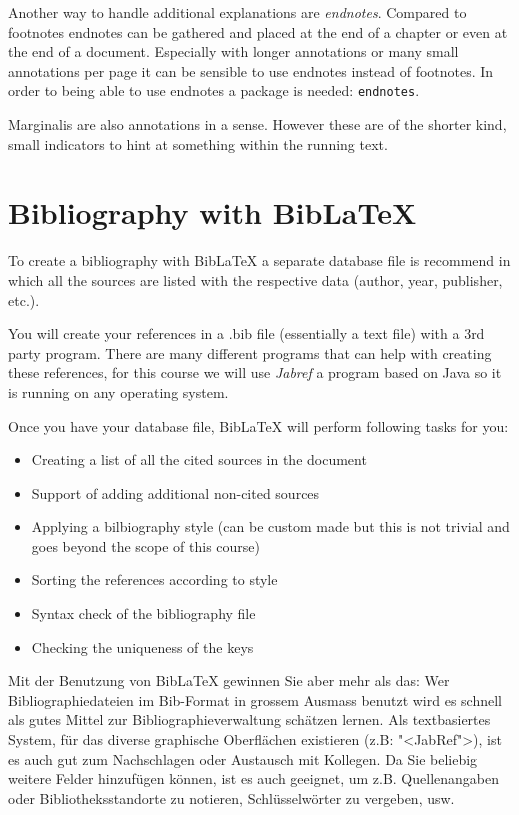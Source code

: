 \documentclass[11pt, a4paper]{article}
\newcommand{\ltx}{\LaTeX}
\let\oldmarginpar\marginpar
\renewcommand{\marginpar}[1]{\oldmarginpar{\textit{#1}}}
\begin{document}
Another way to handle additional explanations are \textit{endnotes}\marginpar{endnotes}. Compared to footnotes endnotes can be gathered and placed at the end of a chapter or even at the end of a document. Especially with longer annotations or many small annotations per page it can be sensible to use endnotes instead of footnotes. In order to being able to use endnotes a package is needed: \texttt{endnotes}.

Marginalis\marginpar{Marginalis} are also annotations in a sense. However these are of the shorter kind, small indicators to hint at something within the running text.

\section{Bibliography with Bib\LaTeX}

To create a bibliography with Bib\ltx{} a separate database file is recommend in which all the sources are listed with the respective data (author, year, publisher, etc.). 

You will create your references in a .bib file (essentially a text file) with a 3rd party program. There are many different programs that can help with creating these references, for this course we will use \textit{Jabref} a program based on Java so it is running on any operating system.

Once you have your database file, Bib\ltx{} will perform following tasks for you:
\begin{itemize}
\item Creating a list of all the cited sources in the document
\item Support of adding additional non-cited sources
\item Applying a bilbiography style (can be custom made but this is not trivial and goes beyond the scope of this course)
\item Sorting the references according to style
\item Syntax check of the bibliography file
\item Checking the uniqueness of the keys
\end{itemize}


Mit der Benutzung von Bib\LaTeX{} gewinnen Sie aber mehr als das: Wer Bibliographiedateien im Bib-Format in grossem Ausmass benutzt wird es schnell als gutes Mittel zur Bibliographieverwaltung schätzen lernen. Als textbasiertes System, für das diverse graphische Oberflächen existieren (z.B: "<JabRef">), ist es auch gut zum Nachschlagen oder Austausch mit Kollegen. Da Sie beliebig weitere Felder hinzufügen können, ist es auch geeignet, um z.B. Quellenangaben oder Bibliotheksstandorte zu notieren, Schlüsselwörter zu vergeben, usw.
\end{document}
